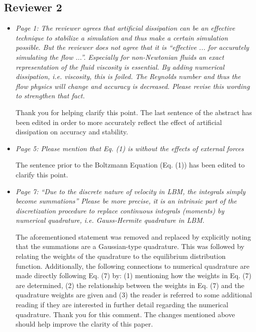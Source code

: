 \documentclass{article}
\begin{document}
	\subsection*{Reviewer 2}
	
	\begin{itemize}
		
	\item \emph{Page 1: The reviewer agrees that artificial dissipation can be an effective technique
		to stabilize a simulation and thus make a certain simulation possible. But the
		reviewer does not agree that it is “effective ... for accurately simulating the flow ...”.
		Especially for non-Newtonian fluids an exact representation of the fluid viscosity is
		essential. By adding numerical dissipation, i.e. viscosity, this is foiled. The Reynolds
		number and thus the flow physics will change and accuracy is decreased. Please
		revise this wording to strengthen that fact.}
	
	Thank you for helping clarify this point. The last sentence of the abstract has been edited in order to more accurately reflect the effect of artificial dissipation on accuracy and stability.
	
	\item \emph{Page 5: Please mention that Eq. (1) is without the effects of external forces}
	
	The sentence prior to the Boltzmann Equation (Eq. (1)) has been edited to clarify this point.
	
	\item \emph{Page 7: ``Due to the discrete nature of velocity in LBM, the integrals simply become
		summations'' Please be more precise, it is an intrinsic part of the discretization
		procedure to replace continuous integrals (moments) by numerical quadrature, i.e.
		Gauss-Hermite quadrature in LBM.}
	
	The aforementioned statement was removed and replaced by explicitly noting that the summations are a Gaussian-type quadrature.
	This was followed by relating the weights of the quadrature to the equilibrium distribution function.
	Additionally, the following connections to numerical quadrature are made directly following Eq. (7) by: (1) mentioning how the weights in Eq. (7) are determined, (2) the relationship between the weights in Eq. (7) and the quadrature weights are given and (3) the reader is referred to some additional reading if they are interested in further detail regarding the numerical quadrature.
	Thank you for this comment.
	The changes mentioned above should help improve the clarity of this paper.
	

\end{itemize}
\end{document}
